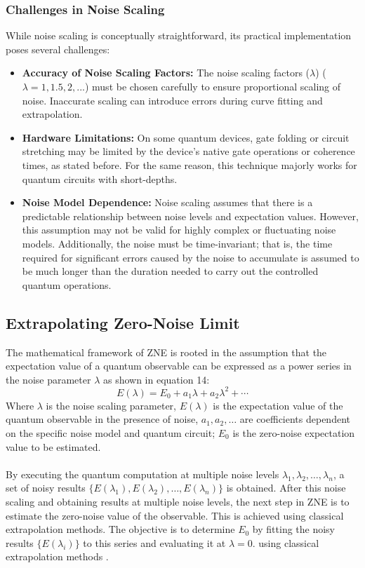 \documentclass[12pt]{article}
\begin{document}
\subsubsection{Challenges in Noise Scaling}
While noise scaling is conceptually straightforward, its practical implementation poses several challenges:
\begin{itemize}
    \item \textbf{Accuracy of Noise Scaling Factors:} The noise scaling factors ($\lambda$) ($\lambda = 1, 1.5, 2, ...$) must be chosen carefully to ensure proportional scaling of noise. Inaccurate scaling can introduce errors during curve fitting and extrapolation.
    \item \textbf{Hardware Limitations:} On some quantum devices, gate folding or circuit stretching may be limited by the device's native gate operations or coherence times, as stated before. For the same reason, this technique majorly works for quantum circuits with short-depths.
    \item \textbf{Noise Model Dependence:} Noise scaling assumes that there is a predictable relationship between noise levels and expectation values. However, this assumption may not be valid for highly complex or fluctuating noise models. Additionally, the noise must be time-invariant; that is, the time required for significant errors caused by the noise to accumulate is assumed to be much longer than the duration needed to carry out the controlled quantum operations.
\end{itemize}

\subsection{Extrapolating Zero-Noise Limit}
The mathematical framework of ZNE is rooted in the assumption that the expectation value of a quantum observable can be expressed as a power series in the noise parameter $\lambda$ as shown in equation 14:
\begin{equation}
E(\lambda) = E_0 + a_1 \lambda + a_2 \lambda^2 + \cdots
\end{equation}
Where $\lambda$ is the noise scaling parameter, $E(\lambda)$ is the expectation value of the quantum observable in the presence of noise, $a_1, a_2, \ldots$ are coefficients dependent on the specific noise model and quantum circuit; $E_0$ is the zero-noise expectation value to be estimated.
\\ \\
By executing the quantum computation at multiple noise levels $\lambda_1, \lambda_2, \ldots, \lambda_n$, a set of noisy results $\{E(\lambda_1), E(\lambda_2), \ldots, E(\lambda_n)\}$ is obtained. After this noise scaling and obtaining results at multiple noise levels, the next step in ZNE is to estimate the zero-noise value of the observable. This is achieved using classical extrapolation methods. The objective is to determine $E_0$ by fitting the noisy results $\{E(\lambda_i)\}$ to this series and evaluating it at $\lambda = 0$. using classical extrapolation methods \cite{Giurgica_Tiron_2020}.
\end{document}
